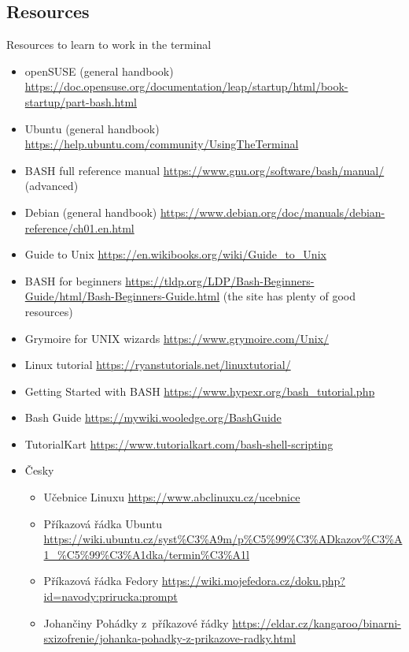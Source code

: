 \documentclass[compress, xelatex, 11pt, xcolor=svgnames, aspectratio=169, url={hyphens, lowtilde}]{beamer}
\begin{document}
\subsection{Resources}

\begin{frame}[allowframebreaks]{Resources to learn to work in the terminal}
	\begin{itemize}
		\item openSUSE (general handbook) \url{https://doc.opensuse.org/documentation/leap/startup/html/book-startup/part-bash.html}
		\item Ubuntu (general handbook) \url{https://help.ubuntu.com/community/UsingTheTerminal}
		\item BASH full reference manual \url{https://www.gnu.org/software/bash/manual/} (advanced)
		\item Debian (general handbook) \url{https://www.debian.org/doc/manuals/debian-reference/ch01.en.html}
		\item Guide to Unix \url{https://en.wikibooks.org/wiki/Guide_to_Unix}
		\item BASH for beginners \url{https://tldp.org/LDP/Bash-Beginners-Guide/html/Bash-Beginners-Guide.html} (the site has plenty of good resources)
		\item Grymoire for UNIX wizards \url{https://www.grymoire.com/Unix/}
		\item Linux tutorial \url{https://ryanstutorials.net/linuxtutorial/}
		\item Getting Started with BASH \url{https://www.hypexr.org/bash_tutorial.php}
		\item Bash Guide \url{https://mywiki.wooledge.org/BashGuide}
		\item TutorialKart \url{https://www.tutorialkart.com/bash-shell-scripting}
		\item Česky
		\begin{itemize}
			\item Učebnice Linuxu \url{https://www.abclinuxu.cz/ucebnice}
			\item Příkazová řádka Ubuntu \url{https://wiki.ubuntu.cz/syst\%C3\%A9m/p\%C5\%99\%C3\%ADkazov\%C3\%A1_\%C5\%99\%C3\%A1dka/termin\%C3\%A1l}
			\item Příkazová řádka Fedory \url{https://wiki.mojefedora.cz/doku.php?id=navody:prirucka:prompt}
			\item Johančiny Pohádky z~příkazové řádky \url{https://eldar.cz/kangaroo/binarni-sxizofrenie/johanka-pohadky-z-prikazove-radky.html}
		\end{itemize}
	\end{itemize}
\end{frame}
\end{document}
